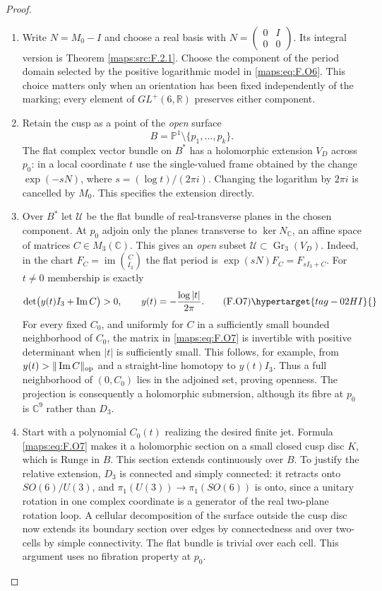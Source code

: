 \begin{proof}
\begin{enumerate}[label={$\langle1\rangle$\arabic*.}]
\item Write $N=M_0-I$ and choose a real basis with
$N=\left(\begin{smallmatrix}0&I\\0&0\end{smallmatrix}\right)$.
Its integral version is Theorem \ref{maps:src:F.2.1}.  Choose the component
of the period domain selected by the positive logarithmic
model in \eqref{maps:eq:F.O6}.  This choice matters only when an orientation
has been fixed independently of the marking; every element
of $GL^+(6,\mathbb R)$ preserves either component.

\item Retain the cusp as a point of the \emph{open} surface
\[
 B=\mathbb P^1\setminus\{p_1,\ldots,p_k\}.
\]
The flat complex vector bundle on $B^*$ has a holomorphic
extension $V_D$ across $p_0$: in a local coordinate $t$ use
the single-valued frame obtained by the change
$\exp(-sN)$, where $s=(\log t)/(2\pi i)$.
Changing the logarithm by $2\pi i$ is cancelled by $M_0$.
This specifies the extension directly.

\item Over $B^*$ let $\mathscr U$ be the flat bundle of real-transverse
planes in the chosen component.  At $p_0$ adjoin only the
planes transverse to $\ker N_\mathbb C$, an affine space of
matrices $C\in M_3(\mathbb C)$.  This gives an \emph{open}
subset $\mathscr U\subset\operatorname{Gr}_3(V_D)$.
Indeed, in the chart $F_C=\operatorname{im}\binom C{I_3}$
the flat period is
$\exp(sN)F_C=F_{sI_3+C}$.  For $t\ne0$ membership is exactly
\[
 \det\bigl(y(t)I_3+\operatorname{Im}C\bigr)>0,
 \qquad y(t)=-\frac{\log|t|}{2\pi}.
 \tag{F.O7}\hypertarget{tag-02HI}{}\label{maps:eq:F.O7}
\]
For every fixed $C_0$, and uniformly for $C$ in a sufficiently
small bounded neighborhood of $C_0$, the matrix in \eqref{maps:eq:F.O7} is
invertible with positive determinant when $|t|$ is sufficiently
small.  This follows, for example, from
$y(t)>\|\operatorname{Im}C\|_{\rm op}$ and a straight-line
homotopy to $y(t)I_3$.  Thus a full neighborhood of
$(0,C_0)$ lies in the adjoined set, proving openness.
The projection is consequently a holomorphic submersion,
although its fibre at $p_0$ is $\mathbb C^9$ rather than $D_3$.

\item Start with a polynomial $C_0(t)$ realizing the desired finite
jet.  Formula \eqref{maps:eq:F.O7} makes it a holomorphic section on a small
closed cusp disc $K$, which is Runge in $B$.
This section extends continuously over $B$.  To justify the
relative extension, $D_3$ is connected and simply connected:
it retracts onto $SO(6)/U(3)$, and
$\pi_1(U(3))\to\pi_1(SO(6))$ is onto, since a unitary rotation
in one complex coordinate is a generator of the real
two-plane rotation loop.  A cellular decomposition of the
surface outside the cusp disc now extends its boundary
section over edges by connectedness and over two-cells by
simple connectivity.  The flat bundle is trivial over each
cell.  This argument uses no fibration property at $p_0$.


\end{enumerate}
\end{proof}
